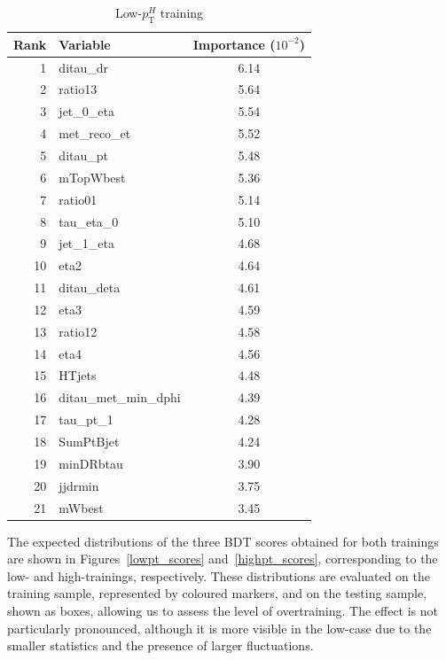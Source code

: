 \begin{table}[!htbp]
\begin{subtable}[t]{0.48\textwidth}
  \end{subtable}%
  \hfill
  \begin{subtable}[t]{0.48\textwidth}
    \centering
    \begin{tabular}{r l c}
      \toprule
      \textbf{Rank} & \textbf{Variable} & \textbf{Importance} \tiny{($10^{-2}$)} \\
      \midrule
       1 & ditau\_dr             & 6.14 \\
       2 & ratio13               & 5.64 \\
       3 & jet\_0\_eta           & 5.54 \\
       4 & met\_reco\_et         & 5.52 \\
       5 & ditau\_pt             & 5.48 \\
       6 & mTopWbest             & 5.36 \\
       7 & ratio01               & 5.14 \\
       8 & tau\_eta\_0           & 5.10 \\
       9 & jet\_1\_eta           & 4.68 \\
      10 & eta2                  & 4.64 \\
      11 & ditau\_deta           & 4.61 \\
      12 & eta3                  & 4.59 \\
      13 & ratio12               & 4.58 \\
      14 & eta4                  & 4.56 \\
      15 & HTjets                & 4.48 \\
      16 & ditau\_met\_min\_dphi & 4.39 \\
      17 & tau\_pt\_1            & 4.28 \\
      18 & SumPtBjet             & 4.24 \\
      19 & minDRbtau             & 3.90 \\
      20 & jjdrmin              & 3.75 \\
      21 & mWbest                & 3.45 \\
      \bottomrule
    \end{tabular}
    \caption{Low-$p_{\mathrm{T}}^{H}$ training}
  \end{subtable}
  \label{tab:bdt_importance_high_low}
\end{table}

The expected distributions of the three BDT scores obtained for both trainings are shown in Figures~\ref{lowpt_scores} and~\ref{highpt_scores}, corresponding to the low- and high-\pth trainings, respectively. These distributions are evaluated on the training sample, represented by coloured markers, and on the testing sample, shown as boxes, allowing us to assess the level of overtraining. The effect is not particularly pronounced, although it is more visible in the low-\pth case due to the smaller statistics and the presence of larger fluctuations.  


